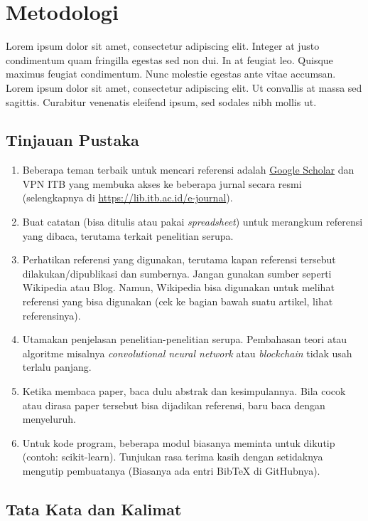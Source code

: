 \chapter{Metodologi}

Lorem ipsum dolor sit amet, consectetur adipiscing elit. Integer at justo condimentum quam fringilla egestas sed non dui. In at feugiat leo. Quisque maximus feugiat condimentum. Nunc molestie egestas ante vitae accumsan. Lorem ipsum dolor sit amet, consectetur adipiscing elit. Ut convallis at massa sed sagittis. Curabitur venenatis eleifend ipsum, sed sodales nibh mollis ut.


\section{Tinjauan Pustaka}

\begin{enumerate}
    \item Beberapa teman terbaik untuk mencari referensi adalah \href{https://scholar.google.com}{Google Scholar} dan VPN ITB yang membuka akses ke beberapa jurnal secara resmi (selengkapnya di \url{https://lib.itb.ac.id/e-journal}).
    \item Buat catatan (bisa ditulis atau pakai \textit{spreadsheet}) untuk merangkum referensi yang dibaca, terutama terkait penelitian serupa.
    \item Perhatikan referensi yang digunakan, terutama kapan referensi tersebut dilakukan/dipublikasi dan sumbernya. Jangan gunakan sumber seperti Wikipedia atau Blog. Namun, Wikipedia bisa digunakan untuk melihat referensi yang bisa digunakan (cek ke bagian bawah suatu artikel, lihat referensinya).
    \item Utamakan penjelasan penelitian-penelitian serupa. Pembahasan teori atau algoritme misalnya \textit{convolutional neural network} atau \textit{blockchain} tidak usah terlalu panjang.
    \item Ketika membaca paper, baca dulu abstrak dan kesimpulannya. Bila cocok atau dirasa paper tersebut bisa dijadikan referensi, baru baca dengan menyeluruh.
    \item Untuk kode program, beberapa modul biasanya meminta untuk dikutip (contoh: scikit-learn). Tunjukan rasa terima kasih dengan setidaknya mengutip pembuatanya (Biasanya ada entri BibTeX di GitHubnya).
\end{enumerate}


\section{Tata Kata dan Kalimat}

